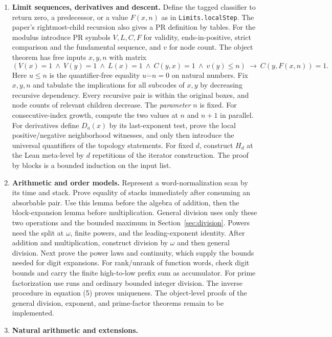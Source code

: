 \begin{enumerate}[leftmargin=*,label=\arabic*.]
\item \textbf{Limit sequences, derivatives and descent.}
Define the tagged classifier to return zero, a predecessor, or a value $F(x,n)$ as in \texttt{Limits.localStep}. The paper's rightmost-child recursion also gives a PR definition by tables. For the modulus introduce PR symbols $V,L,C,F$ for validity, ends-in-positive, strict comparison and the fundamental sequence, and $v$ for node count. The object theorem has free inputs $x,y,n$ with matrix
\[
 (V(x)=1\ \wedge\ V(y)=1\ \wedge\ L(x)=1\ \wedge\ C(y,x)=1\ \wedge\ v(y)\le n)
 \ \longrightarrow\ C(y,F(x,n))=1 .
\]
Here $u\le n$ is the quantifier-free equality $u\mathbin{\dot-}n=0$ on natural numbers. Fix $x,y,n$ and tabulate the implications for all subcodes of $x,y$ by decreasing recursive dependency. Every recursive pair is within the original boxes, and node counts of relevant children decrease. The \emph{parameter} $n$ is fixed. For consecutive-index growth, compute the two values at $n$ and $n+1$ in parallel. For derivatives define $D_a(x)$ by its last-exponent test, prove the local positive/negative neighborhood witnesses, and only then introduce the universal quantifiers of the topology statements. For fixed $d$, construct $H_d$ at the Lean meta-level by $d$ repetitions of the iterator construction. The proof by blocks is a bounded induction on the input list.
\item \textbf{Arithmetic and order models.}
Represent a word-normalization scan by its time and stack. Prove equality of stacks immediately after consuming an absorbable pair. Use this lemma before the algebra of addition, then the block-expansion lemma before multiplication. General division uses only these two operations and the bounded maximum in Section~\ref{sec:division}. Powers need the split at $\omega$, finite powers, and the leading-exponent identity. After addition and multiplication, construct division by $\omega$ and then general division. Next prove the power laws and continuity, which supply the bounds needed for digit expansions. For rank/unrank of function words, check digit bounds and carry the finite high-to-low prefix sum as accumulator. For prime factorization use runs and ordinary bounded integer division. The inverse procedure in equation (5) proves uniqueness. The object-level proofs of the general division, exponent, and prime-factor theorems remain to be implemented.
\item \textbf{Natural arithmetic and extensions.}

\end{enumerate}
